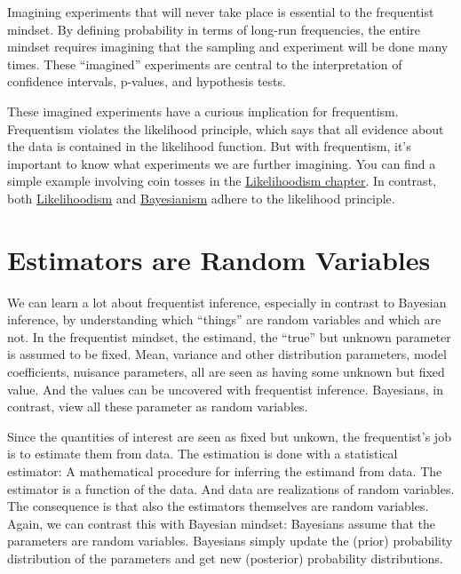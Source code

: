 \documentclass[
  10pt,
]{scrbook}
\begin{document}
Imagining experiments that will never take place is essential to the frequentist mindset.
By defining probability in terms of long-run frequencies, the entire mindset requires imagining that the sampling and experiment will be done many times.
These ``imagined'' experiments are central to the interpretation of confidence intervals, p-values, and hypothesis tests.

These imagined experiments have a curious implication for frequentism.
Frequentism violates the likelihood principle, which says that all evidence about the data is contained in the likelihood function.
But with frequentism, it's important to know what experiments we are further imagining.
You can find a simple example involving coin tosses in the \protect\hyperlink{likelihoodism}{Likelihoodism chapter}.
In contrast, both \protect\hyperlink{likelihoodism}{Likelihoodism} and \protect\hyperlink{bayesianism}{Bayesianism} adhere to the likelihood principle.

\hypertarget{estimators-are-random-variables}{%
\section{Estimators are Random Variables}\label{estimators-are-random-variables}}

We can learn a lot about frequentist inference, especially in contrast to Bayesian inference, by understanding which ``things'' are random variables and which are not.
In the frequentist mindset, the estimand, the ``true'' but unknown parameter is assumed to be fixed.
Mean, variance and other distribution parameters, model coefficients, nuisance parameters, all are seen as having some unknown but fixed value.
And the values can be uncovered with frequentist inference.
Bayesians, in contrast, view all these parameter as random variables.

Since the quantities of interest are seen as fixed but unkown, the frequentist's job is to estimate them from data.
The estimation is done with a statistical estimator: A mathematical procedure for inferring the estimand from data.
The estimator is a function of the data.
And data are realizations of random variables.
The consequence is that also the estimators themselves are random variables.
Again, we can contrast this with Bayesian mindset:
Bayesians assume that the parameters are random variables.
Bayesians simply update the (prior) probability distribution of the parameters and get new (posterior) probability distributions.
\end{document}
